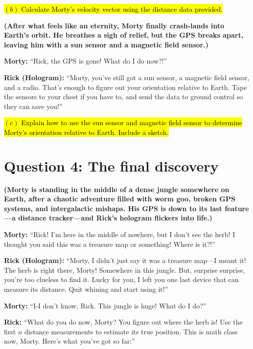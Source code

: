 \documentclass[a4paper, 12pt]{exam}
\begin{document}
\bigskip

\hl{$(b)$ Calculate Morty's velocity vector using the distance data provided.}

\bigskip

\noindent \textbf{(After what feels like an eternity, Morty finally crash-lands into Earth’s orbit. He breathes a sigh of relief, but the GPS breaks apart, leaving him with a sun sensor and a magnetic field sensor.)} 

\bigskip

\noindent \textbf{Morty:} “Rick, the GPS is gone! What do I do now?!” 

\bigskip

\noindent \textbf{Rick (Hologram):} “Morty, you’ve still got a sun sensor, a magnetic field sensor, and a radio. That’s enough to figure out your orientation relative to Earth. Tape the sensors to your chest if you have to, and send the data to ground control so they can save you!”

\bigskip

\hl{$(c)$ Explain how to use the sun sensor and magnetic field sensor to determine Morty's orientation relative to Earth. Include a sketch.}	
	
\pagebreak

\section*{Question 4: The final discovery}

\noindent \textbf{(Morty is standing in the middle of a dense jungle somewhere on Earth, after a chaotic adventure filled with worm goo, broken GPS systems, and intergalactic mishaps. His GPS is down to its last feature—a distance tracker—and Rick’s hologram flickers into life.)}

\bigskip
\noindent \textbf{Morty:} “Rick! I’m here in the middle of nowhere, but I don’t see the herb! I thought you said this was a treasure map or something! Where is it?!” \bigskip

\noindent \textbf{Rick (Hologram):} “Morty, I didn’t just say it was a treasure map—I meant it! The herb is right there, Morty! Somewhere in this jungle. But, surprise surprise, you’re too clueless to find it. Lucky for you, I left you one last device that can measure its distance. Quit whining and start using it!” \bigskip

\noindent \textbf{Morty:} “I-I don’t know, Rick. This jungle is huge! What do I do?” \bigskip

\noindent \textbf{Rick:} “What do you do now, Morty? You figure out where the herb is! Use the first \(n\) distance measurements to estimate its true position. This is math class now, Morty. Here’s what you’ve got so far:”
\end{document}
